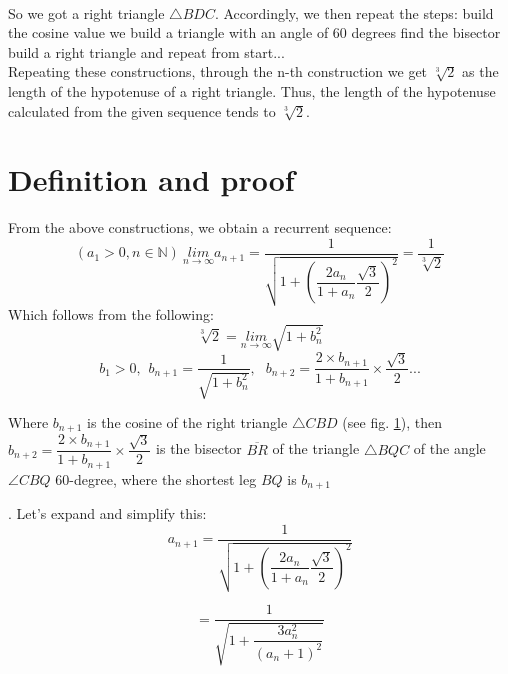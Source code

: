 \documentclass[12pt, letterpaper, oneside]{report}
\begin{document}
\begin{enumerate}
\begin{figure}[h]
	\caption{}
	\label{fig:bdc}
\end{figure}\\
So we got a right triangle $\triangle BDC$. Accordingly, we then repeat the steps:
\subitem build the cosine value
\subitem we build a triangle with an angle of 60 degrees
\subitem find the bisector
\subitem build a right triangle
\subitem and repeat from start...\\
Repeating these constructions, through the n-th construction we get $\sqrt[3]{2}$ as the length of the hypotenuse of a right triangle. Thus, the length of the hypotenuse calculated from the given sequence tends to $\sqrt[3]{2}$.
\newpage
\section{Definition and proof}
From the above constructions, we obtain a recurrent sequence:
\begin{equation}
( a_{1} > 0,  n \in \mathbb N ) \ \underset{n\to \infty }{lim} a_{n+1} = \dfrac{ 1 }{ \sqrt{ 1 + \left( \dfrac{ 2 a_{ n } }{ 1 + a_{ n } } \dfrac{ \sqrt{ 3 } }{ 2 } \right)^{2} } } =\dfrac{ 1 }{ \sqrt[3]{ 2 } }
\end{equation}\label{eq:recurr-relation}
Which follows from the following:
\begin{equation}
\sqrt[3]{2}= \underset{n\to \infty }{lim} \sqrt{1+b_{n}^2}
\end{equation}
\begin{equation}
b_{1}>0, \hspace{5pt} b_{n+1}=\dfrac{1}{\sqrt{1+b_{n}^{2}}},\ \hspace{5pt} b_{n+2}=\dfrac{2\times b_{n+1}}{1+b_{n+1}}\times\dfrac{\sqrt{3}}{2} ...
\end{equation}

Where $b_{n+1}$ is the cosine of the right triangle $\triangle CBD$ (see fig. \ref{fig:bdc}), \newline then $b_{n+2}=\dfrac{2\times b_{n+1}}{1+b_{n+1}}\times\dfrac{\sqrt{3}}{2}$ is the bisector $\overline{BR}$ of the triangle $\triangle BQC$ of the angle $\angle CBQ$ 60-degree, where the shortest leg $BQ$  is $ b_{n+1} $ 


\end{enumerate}.
Let's expand and simplify this:
\[
a_{n+1} =\dfrac{ 1 }{ \sqrt{ 1 + \left( \dfrac{ 2 a_{ n } }{ 1 + a_{ n } }\dfrac{ \sqrt{ 3 } }{ 2 }\right)^{ 2 } } }
\]

\[
=\dfrac{1}{\sqrt{1+\dfrac{3a_{n}^{2}}{(a_{n}+1)^{2}}}}
\]
\end{document}
